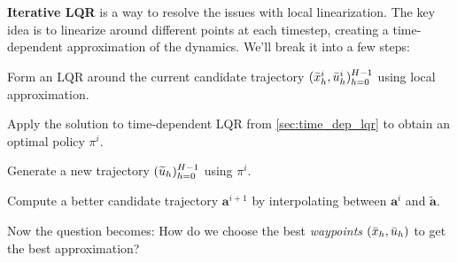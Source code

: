 \documentclass[../main/main]{subfiles}
\begin{document}
\textbf{Iterative LQR} is a way to resolve the issues with local linearization.
The key idea is to linearize around different points at each timestep, creating a time-dependent approximation of the dynamics.
We'll break it into a few steps:
\begin{steps}
    \item Form an LQR around the current candidate trajectory $(\bar {x}^i_h, \bar {u}^i_h)_{h=0}^{H-1}$ using local approximation.
    \item Apply the solution to time-dependent LQR from \autoref{sec:time_dep_lqr} to obtain an optimal policy $\pi^i$.
    \item Generate a new trajectory $(\widetilde {u}_h)_{h=0}^{H-1}$ using $\pi^i$.
    \item Compute a better candidate trajectory $\mathbf{a}^{i+1}$ by interpolating between $\mathbf{a}^i$ and $\tilde {\mathbf{a}}$.
\end{steps}
Now the question becomes: How do we choose the best \emph{waypoints} $(\bar {x}_h, \bar {u}_h)$ to get the best approximation?
\end{document}
